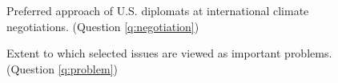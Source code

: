 


\begin{figure}[h!]
    \caption{Preferred approach of U.S. diplomats at international climate negotiations. (Question \ref{q:negotiation})}\label{fig:negotiation}
\end{figure}


\begin{figure}[h!]
    \caption{Extent to which selected issues are viewed as important problems. (Question \ref{q:problem})}\label{fig:problem}
\end{figure}

